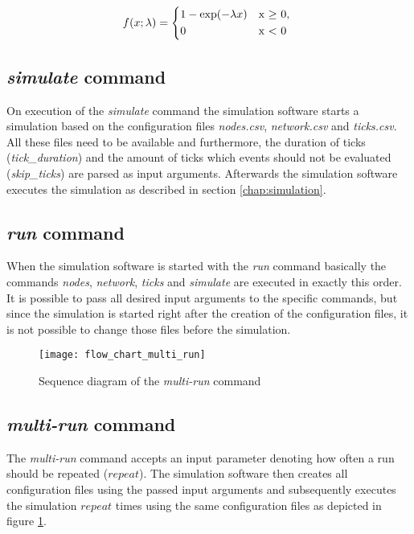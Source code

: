  \begin{equation} \label{eq:exponential}
f(x; \lambda) = \begin{cases*}
        1 - \exp(-\lambda x) & x  $\geq$ 0, \\
        0                                    &  x < 0
        \end{cases*}
\end{equation}

\subsection{\textit{simulate} command} \label{chap:simulate_command}

On execution of the \textit{simulate} command the simulation software starts a simulation based on the configuration files \textit{nodes.csv}, \textit{network.csv} and \textit{ticks.csv}.
All these files need to be available and furthermore, the duration of ticks (\textit{tick\_duration}) and the amount of ticks which events should not be evaluated (\textit{skip\_ticks}) are parsed as input arguments.
Afterwards the simulation software executes the simulation as described in section \ref{chap:simulation}.

\subsection{\textit{run} command} \label{chap:run_command}

When the simulation software is started with the \textit{run} command basically the commands \textit{nodes}, \textit{network}, \textit{ticks} and \textit{simulate} are executed in exactly this order.
It is possible to pass all desired input arguments to the specific commands, but since the simulation is started right after the creation of the configuration files, it is not possible to change those files before the simulation.

\begin{figure}[t]
\texttt{[image: flow\_chart\_multi\_run]}
\centering
\caption{Sequence diagram of the \textit{multi-run} command}
\label{fig:flow_chart_multi_run}
\end{figure}

\subsection{\textit{multi-run} command} \label{chap:multi_run_command}

The \textit{multi-run} command accepts an input parameter denoting how often a run should be repeated ($repeat$).
The simulation software then creates all configuration files using the passed input arguments and subsequently executes the simulation $repeat$ times using the same configuration files as depicted in figure \ref{fig:flow_chart_multi_run}.

